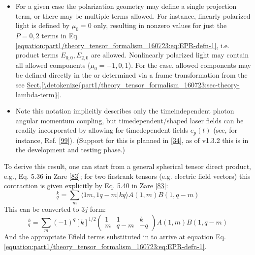 \documentclass[letterpaper,table,10pt,english]{jupyterBook}
\begin{document}
\begin{itemize}
\item {} 
\sphinxAtStartPar
For a given case the polarization geometry may define a single projection term, or there may be multiple terms allowed. For instance, linearly polarized light is defined by \(\mu_0=0\) only, resulting in non\sphinxhyphen{}zero values for just the \(P=0,2\) terms in Eq. \eqref{equation:part1/theory_tensor_formalism_160723:eq:EPR-defn-1}, i.e. product terms \(E_{0,0}, E_{2,0}\) are allowed. Non\sphinxhyphen{}linearly polarized light may contain all allowed components (\(\mu_0=-1,0,1\)). For the {\hyperref[\detokenize{backmatter/glossary:term-MF}]{}} case, allowed components may be defined directly in the {\hyperref[\detokenize{backmatter/glossary:term-MF}]{}} or determined via a frame transformation from the {\hyperref[\detokenize{backmatter/glossary:term-LF}]{}} \sphinxhyphen{} see \hyperref[\detokenize{part1/theory_tensor_formalism_160723:sec-theory-lambda-term}]{Sect.\@ \ref{\detokenize{part1/theory_tensor_formalism_160723:sec-theory-lambda-term}}}.

\item {} 
\sphinxAtStartPar
Note this notation implicitly describes only the time\sphinxhyphen{}independent photon angular momentum coupling, but time\sphinxhyphen{}dependent/shaped laser fields can be readily incorporated by allowing for time\sphinxhyphen{}dependent fields \(e_{p}(t)\) (see, for instance, Ref. {[}\hyperlink{cite.backmatter/bibliography:id663}{99}{]}). (Support for this is planned in  {[}\hyperlink{cite.backmatter/bibliography:id608}{34}{]}, as of v1.3.2 this is in the development and testing phase.)

\end{itemize}

\sphinxAtStartPar
To derive this result, one can start from a general spherical tensor direct product, e.g., Eq. 5.36 in Zare {[}\hyperlink{cite.backmatter/bibliography:id990}{83}{]}; for two first\sphinxhyphen{}rank tensors (e.g. electric field vectors) this contraction is given explicitly by Eq. 5.40 in Zare {[}\hyperlink{cite.backmatter/bibliography:id990}{83}{]}:
\label{equation:part1/theory_tensor_formalism_160723:6dc60947-4009-4d4d-aed1-50a242de2308}\begin{equation}
[A^{(1)}\otimes B^{(1)}]_{q}^{k}=\sum_{m}\langle1m,1q-m|kq\rangle A(1,m)B(1,q-m)
\end{equation}
\sphinxAtStartPar
This can be converted to \(3j\) form:
\label{equation:part1/theory_tensor_formalism_160723:f35649e5-0f1d-47c2-b12a-3ccf27ae0de4}\begin{equation}
[A^{(1)}\otimes B^{(1)}]_{q}^{k}=\sum_{m}(-1)^{q}[k]^{1/2}\left(\begin{array}{ccc}
1 & 1 & k\\
m & q-m & -q
\end{array}\right)A(1,m)B(1,q-m)
\end{equation}
\sphinxAtStartPar
And the appropriate E\sphinxhyphen{}field terms substituted in to arrive at equation Eq. \eqref{equation:part1/theory_tensor_formalism_160723:eq:EPR-defn-1}.
\end{document}
